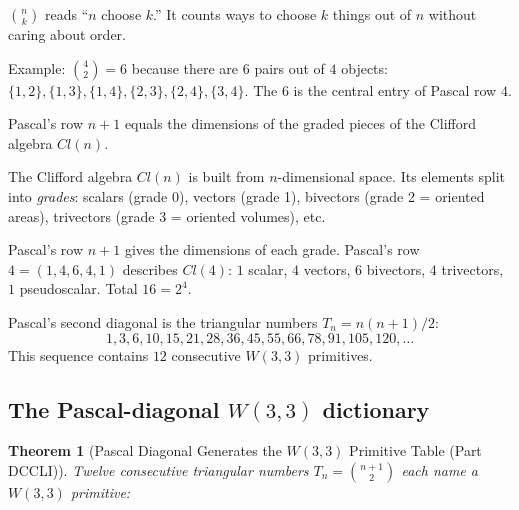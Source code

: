 \documentclass[11pt]{article}
\def\mathrm#1{#1}%
\def\textbf#1{#1}%
\newtheorem*{theorem}{Theorem}
\begin{document}
\begin{mathnote}
$\binom{n}{k}$ reads ``$n$ choose $k$.'' It counts ways to choose $k$ things out of $n$ without caring about order.

Example: $\binom{4}{2} = 6$ because there are $6$ pairs out of $4$ objects: $\{1,2\},\{1,3\},\{1,4\},\{2,3\},\{2,4\},\{3,4\}$. The $6$ is the central entry of Pascal row $4$.
\end{mathnote}

Pascal's row $n+1$ equals the dimensions of the graded pieces of the Clifford algebra $\mathrm{Cl}(n)$.

\begin{mathnote}
The \textbf{Clifford algebra} $\mathrm{Cl}(n)$ is built from $n$-dimensional space. Its elements split into \emph{grades}: scalars (grade 0), vectors (grade 1), bivectors (grade 2 = oriented areas), trivectors (grade 3 = oriented volumes), etc.

Pascal's row $n+1$ gives the dimensions of each grade. Pascal's row $4 = (1, 4, 6, 4, 1)$ describes $\mathrm{Cl}(4)$: $1$ scalar, $4$ vectors, $6$ bivectors, $4$ trivectors, $1$ pseudoscalar. Total $16 = 2^4$.
\end{mathnote}

Pascal's second diagonal is the triangular numbers $T_n = n(n+1)/2$:
\[
1, 3, 6, 10, 15, 21, 28, 36, 45, 55, 66, 78, 91, 105, 120, \ldots
\]
This sequence contains $12$ consecutive $W(3,3)$ primitives.

\subsection*{The Pascal-diagonal $W(3,3)$ dictionary}

\label{sec:pascal-w33-dictionary}

\begin{theorem}[Pascal Diagonal Generates the $W(3,3)$ Primitive Table (Part DCCLI)]
Twelve consecutive triangular numbers $T_n = \binom{n+1}{2}$ each name a $W(3,3)$ primitive:
\end{theorem}
\end{document}
